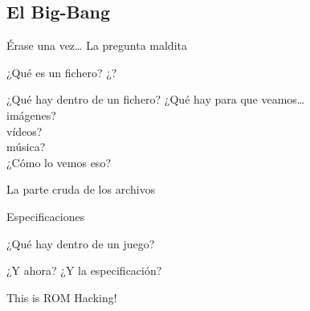 \subsection{El Big-Bang}
\begin{frame}{Érase una vez\ldots}
    \huge \centering
    La pregunta maldita
\end{frame}

\begin{frame}{¿Qué es un fichero?}
    \centering
    \Huge ¿?
\end{frame}

\begin{frame}[t]{¿Qué hay dentro de un fichero?}
    \huge\centering
    ¿Qué hay para que veamos\ldots \\
    imágenes? \\
    vídeos? \\
    música? \\
    \vfill
    ¿Cómo lo vemos eso?
\end{frame}

\begin{frame}{La parte cruda de los archivos}
\end{frame}

\begin{frame}{Especificaciones}
\end{frame}

\begin{frame}{¿Qué hay dentro de un juego?}
\end{frame}

\begin{frame}{¿Y ahora? ¿Y la especificación?}
\end{frame}

\begin{frame}{This is ROM Hacking!}
\end{frame}

